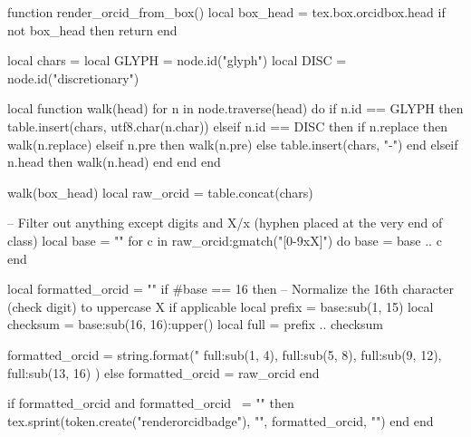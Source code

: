 \documentclass[12pt, twoside]{article}
\begin{document}
\begin{luacode*}
function render_orcid_from_box()
  local box_head = tex.box.orcidbox.head
  if not box_head then return end

  local chars = {}
  local GLYPH = node.id("glyph")
  local DISC  = node.id("discretionary")

  local function walk(head)
    for n in node.traverse(head) do
      if n.id == GLYPH then
        table.insert(chars, utf8.char(n.char))
      elseif n.id == DISC then
        if n.replace then
          walk(n.replace)
        elseif n.pre then
          walk(n.pre)
        else
          table.insert(chars, "-")
        end
      elseif n.head then
        walk(n.head)
      end
    end
  end

  walk(box_head)
  local raw_orcid = table.concat(chars)

  -- Filter out anything except digits and X/x (hyphen placed at the very end of class)
  local base = ""
  for c in raw_orcid:gmatch("[0-9xX]") do
    base = base .. c
  end

  local formatted_orcid = ""
  if #base == 16 then
    -- Normalize the 16th character (check digit) to uppercase X if applicable
    local prefix = base:sub(1, 15)
    local checksum = base:sub(16, 16):upper()
    local full = prefix .. checksum

    formatted_orcid = string.format("%
      full:sub(1, 4),
      full:sub(5, 8),
      full:sub(9, 12),
      full:sub(13, 16)
    )
  else
    formatted_orcid = raw_orcid
  end

  if formatted_orcid and formatted_orcid ~= "" then
    tex.sprint(token.create("renderorcidbadge"), "{", formatted_orcid, "}")
  end
end
\end{luacode*}

\begingroup
\renewcommand*{\mkbibnamefamily}[1]{%
  #1%
  \edef\curridx{\the\value{listcount}}%
  \haspartannotation[author][default][\curridx]{equal}{%
    \textsuperscript{*}%
  }{}%
  \haspartannotation[author][default][\curridx]{orcid}{%
    \global\setbox\orcidbox=\hbox{\getpartannotation[author][default][\curridx]{orcid}}%
    \directlua{render_orcid_from_box()}%
  }{}%
}


\endgroup
\medskip
\end{document}
